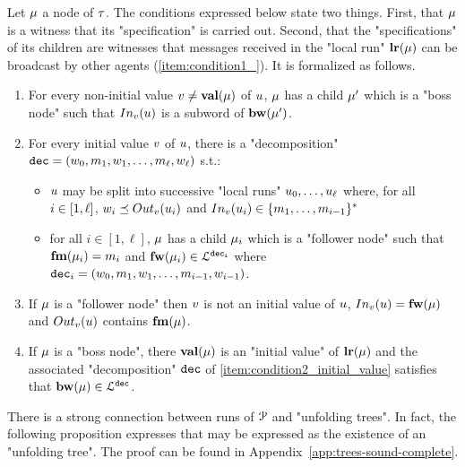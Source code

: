 Let $\mu$ a node of $\tau$. 
The conditions expressed below state two things. First, that $\mu$ is a witness that its "specification" is carried out. Second, that the "specifications" of its children are witnesses that messages received in the "local run" $\mathbf{lr}(\mu)$ can be broadcast by other agents (\ref{item:condition1_}). It is formalized as follows.
\begin{enumerate}[{Condition} (i)]
	\item \label{item:condition1_non_initial_value} For every non-initial value $v \ne \mathbf{val}(\mu)$ of $u$, $\mu$ has a child $\mu'$ which is a "boss node" such that $\vinput{\aval}{\localrun}$ is a subword of $\mathbf{bw}(\mu')$.
	
	\item \label{item:condition2_initial_value} For every initial value $v$ of $u$, there is a "decomposition" $\mathtt{dec} = (w_0, m_1, w_1, \ldots, m_{\ell}, w_{\ell})$ s.t.:
	\begin{itemize}
		\item $u$ may be split into successive "local runs" $u_0, \dots, u_{\ell}$ where, for all $i \in [1,\ell]$, $w_i \subword \voutput{\aval}{\localrun_i}$ and $\vinput{\aval}{\localrun_i} \in \set{m_1, \dots, m_{i-1}}^*$
		\item for all $i \in [1,\ell]$, $\mu$ has a child $\mu_i$ which is a "follower node" such that $\mathbf{fm}(\mu_i) = m_i$ and $\mathbf{fw}(\mu_i) \in\mathcal{L}^{\mathtt{\mathtt{dec}_i}}$ where $\mathtt{dec}_i = (w_0, m_1, w_1, \ldots, m_{i-1}, w_{i-1})$.	\end{itemize}
	
	\item \label{item:condition3_follower_node} If $\mu$ is a "follower node" then $v$ is not an initial value of $u$, $\vinput{\aval}{\localrun} = \followlabelword{\node}$ and 
	$\voutput{\aval}{\localrun}$ contains $\mathbf{fm}(\mu)$.

	\item \label{item:condition4_boss_node} If $\mu$ is a "boss node", there $\mathbf{val}(\mu)$ is an "initial value" of $\mathbf{lr}(\mu)$ and the associated "decomposition" $\mathtt{dec}$ of \ref{item:condition2_initial_value} satisfies that $\mathbf{bw}(\mu) \in \mathcal{L}^{\mathtt{\mathtt{dec}}}$.
\end{enumerate}

There is a strong connection between runs of $\mathcal{P}$ and "unfolding trees". In fact, the following proposition expresses that \COVER may be expressed as the existence of an "unfolding tree". 
The proof can be found in Appendix~\ref{app:trees-sound-complete}.


